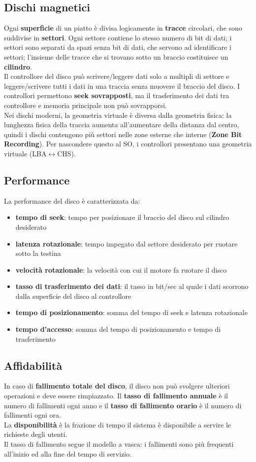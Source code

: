 \documentclass[12pt]{article}
\begin{document}
\subsection{Dischi magnetici}
Ogni \textbf{superficie} di un piatto è divisa logicamente in \textbf{tracce} circolari, che sono suddivise in \textbf{settori}. 
Ogni settore contiene lo stesso numero di bit di dati; i settori sono separati da spazi senza bit di dati, che servono ad 
identificare i settori; l'insieme delle tracce che si trovano sotto un braccio costituisce un \textbf{cilindro}.\\
Il controllore del disco può scrivere/leggere dati solo a multipli di settore e leggere/scrivere tutti i dati in una traccia 
senza muovere il braccio del disco. I controllori permettono \textbf{seek sovrapposti}, ma il trasferimento dei dati tra 
controllore e memoria principale non può sovrapporsi.\\
Nei dischi moderni, la geometria virtuale è diversa dalla geometria fisica: la lunghezza fisica della traccia aumenta 
all'aumentare della distanza dal centro, quindi i dischi contengono più settori nelle zone esterne che interne 
(\textbf{Zone Bit Recording}). Per nascondere questo al SO, i controllori presentano una geometria virtuale (LBA$\leftrightarrow$CHS). 
\subsection{Performance}
La performance del disco è caratterizzata da:
\begin{itemize}
    \item \textbf{tempo di seek}: tempo per posizionare il braccio del disco sul cilindro desiderato
    \item \textbf{latenza rotazionale}: tempo impegato dal settore desiderato per ruotare sotto la testina
    \item \textbf{velocità rotazionale}: la velocità con cui il motore fa ruotare il disco
    \item \textbf{tasso di trasferimento dei dati}: il tasso in bit/sec al quale i dati scorrono dalla superficie del disco 
    al controllore
    \item \textbf{tempo di posizionamento}: somma del tempo di seek e latenza rotazionale
    \item \textbf{tempo d'accesso}: somma del tempo di posizionamento e tempo di trasferimento
\end{itemize}
\subsection{Affidabilità}
In caso di \textbf{fallimento totale del disco}, il disco non può svolgere ulteriori operazioni e deve essere rimpiazzato. 
Il \textbf{tasso di fallimento annuale} è il numero di fallimenti ogni anno e il \textbf{tasso di fallimento orario} è il 
numero di fallimenti ogni ora.\\
La \textbf{disponibilità} è la frazione di tempo il sistema è disponibile a servire le richieste degli utenti.\\
Il tasso di fallimento segue il modello a vasca: i fallimenti sono più frequenti all'inizio ed alla fine del tempo di servizio.
\end{document}
